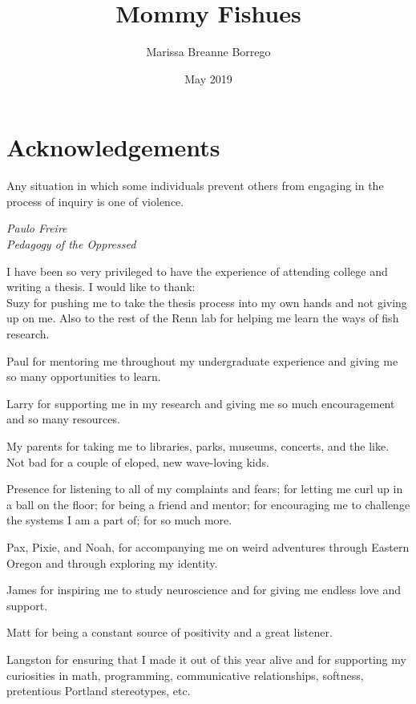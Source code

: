\documentclass[12pt,twoside]{reedthesis}
\title{Mommy Fishues}
\author{Marissa Breanne Borrego}
\date{May 2019}
\begin{document}
  \maketitle
  \frontmatter %
  \pagestyle{empty} %

    \chapter*{Acknowledgements}
	\epigraph{Any situation in which some individuals prevent others from engaging in the process of inquiry is one of violence.}{\textit{Paulo Freire \\ Pedagogy of the Oppressed}}
	
	I have been so very privileged to have the experience of attending college and
  writing a thesis. I would like to thank:\\
	
	Suzy for pushing me to take the thesis process into my own hands and not
  giving up on me. Also to the rest of the Renn lab for helping me learn the ways of fish research.
	
	Paul for mentoring me throughout my undergraduate experience and giving me so many opportunities to learn. 	
  
	Larry for supporting me in my research and giving me so much encouragement and
  so many resources. 

  My parents for taking me to libraries, parks, museums, concerts, and the like.
  Not bad for a couple of eloped, new wave-loving kids. 
	
	Presence for listening to all of my complaints and fears; for
  letting me curl up in a ball on the floor; for being a friend and mentor; for
  encouraging me to challenge the systems I am a part of; for so much more.

  Pax, Pixie, and Noah, for accompanying me on weird adventures through Eastern
  Oregon and through exploring my identity.
	
	James for inspiring me to study neuroscience and for giving me endless love
  and support.

  Matt for being a constant source of positivity and a great listener.
	
	Langston for ensuring that I made it out of this year alive and for supporting my curiosities in math, programming, communicative
  relationships, softness, pretentious Portland stereotypes, etc.
\end{document}
